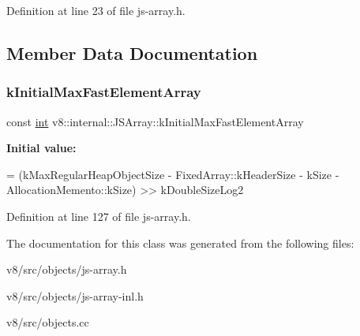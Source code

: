 Definition at line 23 of file js-\/array.\+h.



\subsection{Member Data Documentation}
\mbox{\label{classv8_1_1internal_1_1JSArray_a42a590c6a358190389066e4b127bcf5b}} 
\subsubsection{\texorpdfstring{k\+Initial\+Max\+Fast\+Element\+Array}{kInitialMaxFastElementArray}}
{\footnotesize\ttfamily const \mbox{\hyperlink{classint}{int}} v8\+::internal\+::\+J\+S\+Array\+::k\+Initial\+Max\+Fast\+Element\+Array\hspace{0.3cm}{\ttfamily [static]}}

{\bfseries Initial value\+:}
\begin{DoxyCode}
=
      (kMaxRegularHeapObjectSize - FixedArray::kHeaderSize - kSize -
       AllocationMemento::kSize) >>
      kDoubleSizeLog2
\end{DoxyCode}


Definition at line 127 of file js-\/array.\+h.



The documentation for this class was generated from the following files\+:\begin{DoxyCompactItemize}
\item 
v8/src/objects/js-\/array.\+h\item 
v8/src/objects/js-\/array-\/inl.\+h\item 
v8/src/objects.\+cc\end{DoxyCompactItemize}
